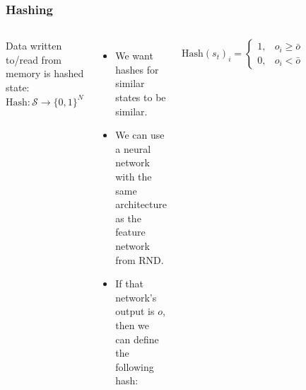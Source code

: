\documentclass{beamer}
\begin{document}
\begin{frame}
  \frametitle{Hashing}

  \begin{columns}
      Data written to/read from memory is hashed state: $\text{Hash}: \mathcal{S} \to \{ 0, 1 \}^N$
      \begin{itemize}
        \item We want hashes for similar states to be similar.
        \item We can use a neural network with the same architecture as the feature network from RND.
        \item If that network's output is $o$, then we can define the following hash:
      \end{itemize}
      \begin{exampleblock}{}
        \begin{equation}
          \text{Hash}(s_t)_i = \begin{cases} 1, & o_i \geq \bar{o} \\ 0, & o_i < \bar{o} \end{cases}
        \end{equation}
      \end{exampleblock}
      \begin{figure}
        \includegraphics[scale=0.25]{assets/hashes.jpg}
      \end{figure}
  \end{columns}
\end{frame}
\end{document}
